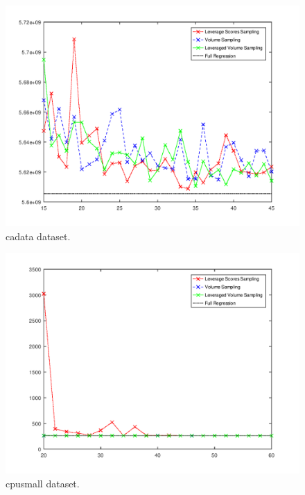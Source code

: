 \documentclass{article}
\begin{document}
        \begin{figure}[h]
            \includegraphics[width=\linewidth]{results/cadata.png}
            \caption{cadata dataset.}
            \label{fig:dataset1}
        \end{figure}
        \begin{figure}
            \includegraphics[width=\linewidth]{results/cpusmall.png}
            \caption{cpusmall dataset.}
            \label{fig:dataset1}
        \end{figure}
\end{document}

